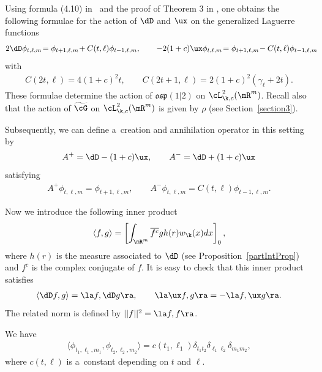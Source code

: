 Using formula (4.10) in~\cite{H12} and the proof of Theorem 3 in \cite{H12}, one obtains the
following formulae for the action of $\dD$ and $\ux$ on the generalized Laguerre functions
\begin{gather}
2 \dD \phi_{t,\ell,m}\! = \phi_{t+1,\ell,m}\! + C(t,\ell) \phi_{t-1,\ell,m},\qquad
-2(1+c) \ux \phi_{t,\ell,m}\! = \phi_{t+1,\ell,m}\! - C(t,\ell) \phi_{t-1,\ell,m}\!\!\!\!\label{ActionOnBasis}
\end{gather}
with
\begin{gather*}
C(2t, \ell)= 4 (1+c)^{2} t,\qquad
C(2t+1, \ell)= 2 (1+c)^{2}(\gamma_{\ell}+ 2t).
\end{gather*}
These formulae determine the action of $\mathfrak{osp}(1|2)$ on $\cL^{2}_{\k,c}(\mR^{m})$.
Recall also that the action of $\widetilde{\cG}$ on $\cL^{2}_{\k,c}(\mR^{m})$ is given by $\rho$
(see Section~\ref{section3}).

Subsequently, we can def\/ine a~creation and annihilation operator in this setting by
\begin{gather}\label{CreaAnn}
A^{+} = \dD - (1+c) \ux,\qquad
A^{-} = \dD + (1+c) \ux
\end{gather}
satisfying
\begin{gather*}%
A^{+} \phi_{t,\ell,m} = \phi_{t+1,\ell,m},\qquad
A^{-} \phi_{t,\ell,m} = C(t, \ell) \phi_{t-1,\ell,m}.
\end{gather*}

Now we introduce the following inner product
\begin{gather*}
\langle f,g\rangle=\left[\int_{\mR^{m}}\overline{f^{c}}g h(r)w_{\k}(x)dx\right]_{0},
\end{gather*}
where $h(r)$ is the measure associated to $\dD$ (see Proposition~\ref{partIntProp}) and $f^{c}$ is
the complex conjugate of $f$.
It is easy to check that this inner product satisf\/ies
\begin{gather}\label{adjointsIP}
\langle \dD f, g \rangle = \la f, \dD g\ra,\qquad
\la \ux f, g \ra = -\la f, \ux g \ra.
\end{gather}
The related norm is def\/ined by $||f||^{2}=\la f,f\ra$.

\begin{theorem}%
We have
\begin{gather*}
\langle\phi_{t_{1},\ell_{1},m_{1}},\phi_{t_{2},\ell_{2},m_{2}}\rangle=c(t_{1},\ell_{1})
\delta_{t_{1}t_{2}}\delta_{\ell_{1}\ell_{2}}\delta_{m_{1}m_{2}},
\end{gather*}
where $c(t,\ell)$ is a~constant depending on $t$ and $\ell$.
\end{theorem}

